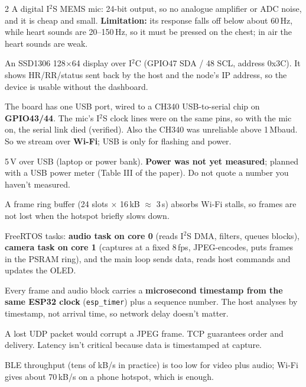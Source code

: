 \begin{multicols}{2}
{A digital I$^2$S MEMS mic: 24-bit output, so no analogue amplifier or ADC noise, and it is cheap and small.
\textbf{Limitation:} its response falls off below about 60\,Hz, while heart sounds are 20--150\,Hz, so it must be pressed on the
chest; in air the heart sounds are weak.}

{An SSD1306 128$\times$64 display over I$^2$C (GPIO47 SDA / 48 SCL, address 0x3C). It shows HR/RR/status sent back by the host and
the node's IP address, so the device is usable without the dashboard.}

{The board has one USB port, wired to a CH340 USB-to-serial chip on \textbf{GPIO43/44}. The mic's I$^2$S clock lines were on
the same pins, so with the mic on, the serial link died (verified). Also the CH340 was unreliable above 1\,Mbaud. So we stream
over \textbf{Wi-Fi}; USB is only for flashing and power.}

{5\,V over USB (laptop or power bank). \textbf{Power was not yet measured}; planned with a USB power meter (Table III of the paper). Do not
quote a number you haven't measured.}

{A frame ring buffer (24 slots $\times$ 16\,kB $\approx$ 3\,s) absorbs Wi-Fi stalls, so frames are not lost when the hotspot
briefly slows down.}



{FreeRTOS tasks: \textbf{audio task on core 0} (reads I$^2$S DMA, filters, queues blocks), \textbf{camera task on core 1}
(captures at a fixed 8\,fps, JPEG-encodes, puts frames in the PSRAM ring), and the main loop sends data, reads host commands and
updates the OLED.}

{Every frame and audio block carries a \textbf{microsecond timestamp from the same ESP32 clock} (\texttt{esp\_timer}) plus a
sequence number. The host analyses by timestamp, not arrival time, so network delay doesn't matter.}

{A lost UDP packet would corrupt a JPEG frame. TCP guarantees order and delivery. Latency isn't critical because data is
timestamped at capture.}

{BLE throughput (tens of kB/s in practice) is too low for video plus audio; Wi-Fi gives about 70\,kB/s on a phone hotspot,
which is enough.}


\end{multicols}
